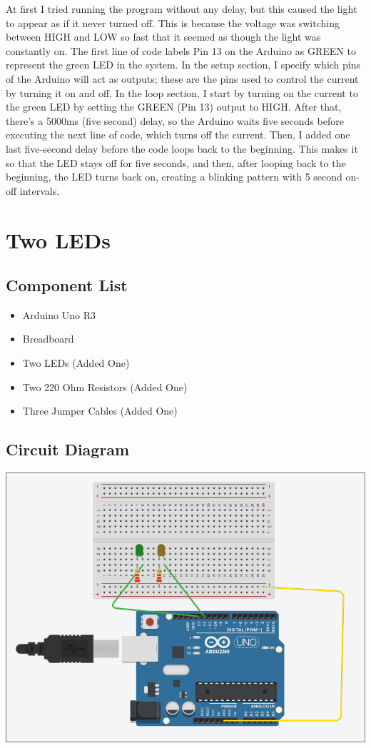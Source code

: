 \documentclass[12pt]{article}
\begin{document}
At first I tried running the program without any delay, but this caused the light to appear as if it never turned off. This is because the voltage was switching between 
HIGH and LOW so fast that it seemed as though the light was constantly on. The first line of code labels Pin 13 on the Arduino as GREEN to represent the green LED in the 
system. In the setup section, I specify which pins of the Arduino will act as outputs; these are the pins used to control the current by turning it on and off. 
In the loop section, I start by turning on the current to the green LED by setting the GREEN (Pin 13) output to HIGH. After that, there's a 5000ms (five second) delay, 
so the Arduino waits five seconds before executing the next line of code, which turns off the current. Then, I added one last five-second delay before the code loops 
back to the beginning. This makes it so that the LED stays off for five seconds, and then, after looping back to the beginning, the LED turns back on, creating a 
blinking pattern with 5 second on-off intervals. 

\section{Two LEDs}

\subsection{Component List}

\begin{itemize}
\item Arduino Uno R3
\item Breadboard
\item Two LEDs (Added One)
\item Two 220 Ohm Resistors (Added One)
\item Three Jumper Cables (Added One)
\end{itemize}

\subsection{Circuit Diagram}
\includegraphics[width=1.0\textwidth]{Two_LED_Diagram.png}
\end{document}
